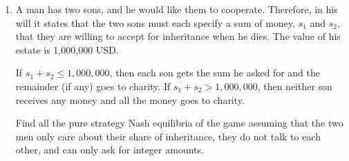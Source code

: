 \documentclass[12pt]{article}
\begin{document}
\begin{enumerate}

\item 
A man has two sons, and he would like them to cooperate. Therefore, in his will it states that the two sons must each specify a sum of money, $s_1$ and $s_2$, that they are willing to accept for inheritance when he dies. The value of his estate is 1,000,000 USD.

If $s_1 + s_2 \leq 1,000,000$, then each son gets the sum he asked for and the remainder (if any) goes to charity. If $s_1 + s_2 > 1,000,000$, then neither son receives any money and all the money goes to charity.

Find all the pure strategy Nash equilibria of the game assuming that the two men only care about their share of inheritance, they do not talk to each other, and can only ask for integer amounts.


\end{enumerate}
\end{document}
